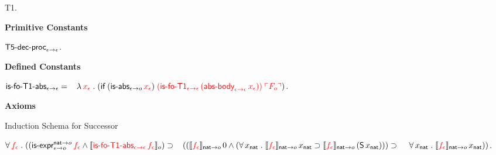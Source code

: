 \documentclass[fleqn,11pt]{article}
\begin{document}
  \be

    \setcounter{enumi}{0}

    \item T1.

  \ee

  \item[] \textbf{Primitive Constants}

  \be

    \setcounter{enumi}{6}

    \item $\mbox{\sf T5-dec-proc}_{\epsilon \rightarrow \epsilon}$.

  \ee

  \item[] \textbf{Defined Constants}

  \be

    \setcounter{enumi}{5}

    \item $\mbox{\sf is-fo-T1-abs}_{\epsilon \rightarrow \epsilon} = {}\\
    \hspace*{2ex}\lambda\, \textcolor{red}{x_\epsilon} \mathrel. 
    (\mbox{\sf if} \; (\mbox{\sf is-abs}_{\epsilon \rightarrow o} \, \textcolor{red}{x_\epsilon}) \;
    \textcolor{red}{(\mbox{\sf is-fo-T1}_{\epsilon \rightarrow \epsilon} \,
    (\mbox{\sf abs-body}_{\epsilon \rightarrow \epsilon} \, x_\epsilon))} \;
    \textcolor{red}{\ulcorner F_o\urcorner})$.

  \ee

  \item[] \textbf{Axioms}

  \be

    \setcounter{enumi}{28}

    \item Induction Schema for Successor

    $\forall\, \textcolor{red}{f_\epsilon} \mathrel. 
    ((\mbox{\sf is-expr}_{\epsilon \rightarrow o}^{{\sf nat} \rightarrow o} \, \textcolor{red}{f_\epsilon} \wedge
    \llbracket\textcolor{red}{\mbox{\sf is-fo-T1-abs}_{\epsilon \rightarrow \epsilon} \, 
    f_\epsilon}\rrbracket_o) \supset {} \\
    \hspace*{2ex}((\llbracket\textcolor{red}{f_\epsilon}\rrbracket_{{\sf nat} \rightarrow o} \, 0 \wedge
    (\forall\, x_{\sf nat} \mathrel. 
    \llbracket\textcolor{red}{f_\epsilon}\rrbracket_{{\sf nat} \rightarrow o} \, x_{\sf nat} \supset
    \llbracket\textcolor{red}{f_\epsilon}\rrbracket_{{\sf nat} \rightarrow o} \, 
    (\mbox{\sf S} \, x_{\sf nat}))) \supset 
    \hspace*{2.8ex}\forall\, x_{\sf nat} \mathrel. 
    \llbracket\textcolor{red}{f_\epsilon}\rrbracket_{{\sf nat} \rightarrow o} \, x_{\sf nat}))$.
\end{document}
